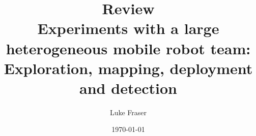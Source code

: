 \documentclass{article}
\begin{document}
\title{{\large Review} \\ Experiments with a large heterogeneous mobile robot team: Exploration, mapping, deployment and detection}
\author{Luke Fraser}
\date{\today}
\maketitle

\begingroup
\renewcommand{\section}[2]{}


\endgroup

\section*{Summary}

\section*{Strengths}

\section*{Critique}

\cite{Parker06experimentswith}
\end{document}
